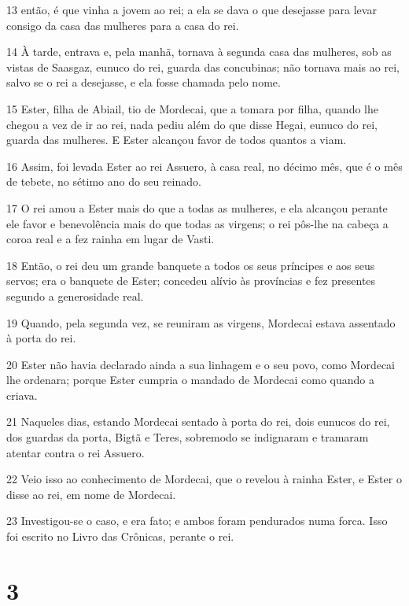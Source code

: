 \par 13 então, é que vinha a jovem ao rei; a ela se dava o que desejasse para levar consigo da casa das mulheres para a casa do rei.
\par 14 À tarde, entrava e, pela manhã, tornava à segunda casa das mulheres, sob as vistas de Saasgaz, eunuco do rei, guarda das concubinas; não tornava mais ao rei, salvo se o rei a desejasse, e ela fosse chamada pelo nome.
\par 15 Ester, filha de Abiail, tio de Mordecai, que a tomara por filha, quando lhe chegou a vez de ir ao rei, nada pediu além do que disse Hegai, eunuco do rei, guarda das mulheres. E Ester alcançou favor de todos quantos a viam.
\par 16 Assim, foi levada Ester ao rei Assuero, à casa real, no décimo mês, que é o mês de tebete, no sétimo ano do seu reinado.
\par 17 O rei amou a Ester mais do que a todas as mulheres, e ela alcançou perante ele favor e benevolência mais do que todas as virgens; o rei pôs-lhe na cabeça a coroa real e a fez rainha em lugar de Vasti.
\par 18 Então, o rei deu um grande banquete a todos os seus príncipes e aos seus servos; era o banquete de Ester; concedeu alívio às províncias e fez presentes segundo a generosidade real.
\par 19 Quando, pela segunda vez, se reuniram as virgens, Mordecai estava assentado à porta do rei.
\par 20 Ester não havia declarado ainda a sua linhagem e o seu povo, como Mordecai lhe ordenara; porque Ester cumpria o mandado de Mordecai como quando a criava.
\par 21 Naqueles dias, estando Mordecai sentado à porta do rei, dois eunucos do rei, dos guardas da porta, Bigtã e Teres, sobremodo se indignaram e tramaram atentar contra o rei Assuero.
\par 22 Veio isso ao conhecimento de Mordecai, que o revelou à rainha Ester, e Ester o disse ao rei, em nome de Mordecai.
\par 23 Investigou-se o caso, e era fato; e ambos foram pendurados numa forca. Isso foi escrito no Livro das Crônicas, perante o rei.

\chapter{3}

